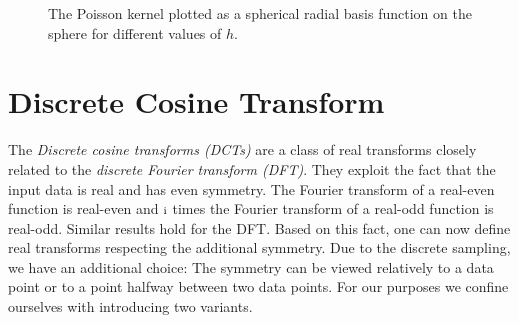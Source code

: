 \begin{figure}[tb]
  \caption{The Poisson kernel plotted as a spherical radial basis function on the sphere for different values of $h$.}
  \label{Basics:Figure:PoissonKernel2}
\end{figure}

\label{Basics:SphericalKernels}

\section{Discrete Cosine Transform}
\label{Basics:DiscreteCosineTransform}

The \emph{Discrete cosine transforms (DCTs)} are a class of real transforms closely related to the 
\emph{discrete Fourier transform (DFT)}. They exploit the fact that the 
input data is real and has even symmetry. The Fourier transform of a real-even 
function is real-even and $\mbox{\scriptsize\rm{i}}$ times the Fourier transform of a real-odd function is real-odd. 
Similar results hold for the DFT. Based on this fact, one can now define 
real transforms respecting the additional symmetry.
Due to the discrete sampling, we have an additional choice: The symmetry can be 
viewed relatively to a data point or to a point halfway between two data points. For our 
purposes we confine ourselves with introducing two variants.

